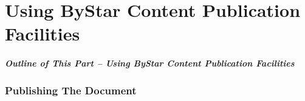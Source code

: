 \newpage
\part{Using ByStar Content Publication Facilities}

\begin{latexonly}
\begin{presentationMode}
\begin{frame}[fragile,plain,label=Part0]
\frametitle{Outline of This Part -- Using ByStar Content Publication Facilities}
\tableofcontents[sectionstyle=show,subsectionstyle=show]
\end{frame}
\end{presentationMode}
\end{latexonly}


\begin{comment}
*  [[elisp:(org-cycle)][| ]] [[elisp:(org-show-subtree)][|=]] [[elisp:(show-children 10)][|V]] [[elisp:(bx:orgm:indirectBufOther)][|>]] [[elisp:(bx:orgm:indirectBufMain)][|I]] [[elisp:(blee:ppmm:org-mode-toggle)][|N]] [[elisp:(org-top-overview)][|O]] [[elisp:(progn (org-shifttab) (org-content))][|C]] [[elisp:(delete-other-windows)][|1]]  /Section/   Publishing The Document ::  [[elisp:(org-cycle)][| ]]
\end{comment}

\section{Publishing The Document}


\begin{comment}
*****  [[elisp:(org-cycle)][| ]]  [[elisp:(blee:ppmm:org-mode-toggle)][Nat]] [[elisp:(beginning-of-buffer)][Top]] [[elisp:(delete-other-windows)][(1)]] || /Frame/ *Label=PublishingTheDocument*  Publishing The Document ::  [[elisp:(org-cycle)][| ]]
\end{comment}

